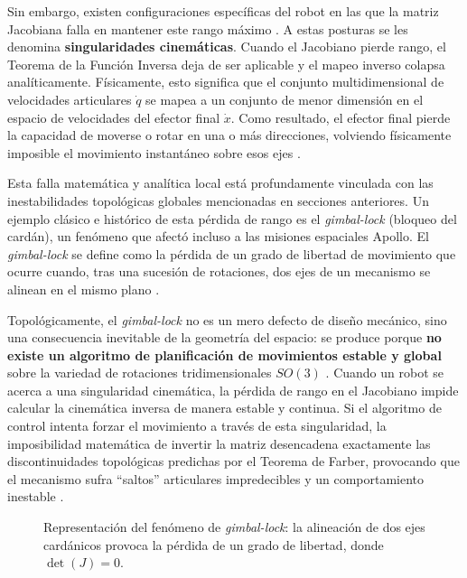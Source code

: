 Sin embargo, existen configuraciones específicas del robot en las que la matriz Jacobiana 
falla en mantener este rango máximo \parencite{lynch2017modern}. A estas posturas se les denomina \textbf{singularidades 
cinemáticas}. Cuando el Jacobiano pierde rango, el Teorema de la Función Inversa deja de 
ser aplicable y el mapeo inverso colapsa analíticamente. Físicamente, esto significa que el 
conjunto multidimensional de velocidades articulares $\dot{q}$ se mapea a un conjunto de menor 
dimensión en el espacio de velocidades del efector final $\dot{x}$. Como resultado, el efector 
final pierde la capacidad de moverse o rotar en una o más direcciones, volviendo físicamente imposible el 
movimiento instantáneo sobre esos ejes \parencite{choset2005principles, lynch2017modern}.

Esta falla matemática y analítica local está profundamente vinculada con las inestabilidades 
topológicas globales mencionadas en secciones anteriores. Un ejemplo clásico e histórico de 
esta pérdida de rango es el \textit{gimbal-lock} (bloqueo del cardán), un fenómeno que afectó 
incluso a las misiones espaciales Apollo. El \textit{gimbal-lock} se define como la pérdida de un 
grado de libertad de movimiento que ocurre cuando, tras una sucesión de rotaciones, dos 
ejes de un mecanismo se alinean en el mismo plano \parencite{Mosquera2017}. 

Topológicamente, el \textit{gimbal-lock} no es un mero defecto de diseño mecánico, sino una consecuencia 
inevitable de la geometría del espacio: se produce porque \textbf{no existe un algoritmo de 
planificación de movimientos estable y global} sobre la variedad de rotaciones tridimensionales 
$SO(3)$ \parencite{Mosquera2017}. Cuando un robot se acerca a una singularidad cinemática, la pérdida de rango en el 
Jacobiano impide calcular la cinemática inversa de manera estable y continua. Si el algoritmo 
de control intenta forzar el movimiento a través de esta singularidad, la imposibilidad 
matemática de invertir la matriz desencadena exactamente las discontinuidades topológicas 
predichas por el Teorema de Farber, provocando que el mecanismo sufra \enquote{saltos} articulares 
impredecibles y un comportamiento inestable \parencite{lynch2017modern}.

\begin{figure}[htbp]
    \centering
    

    \caption{Representación del fenómeno de \textit{gimbal-lock}: la alineación de dos ejes cardánicos provoca la pérdida de un grado de libertad, donde $\det(J) = 0$.}
    \label{fig:gimbal_lock}
\end{figure}